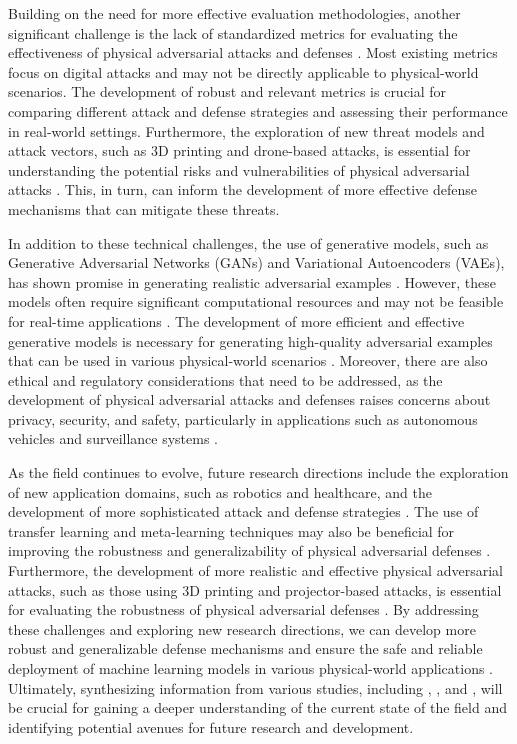 \documentclass[11pt,a4paper]{article}
\begin{document}
Building on the need for more effective evaluation methodologies, another significant challenge is the lack of standardized metrics for evaluating the effectiveness of physical adversarial attacks and defenses \cite{doi:10.1109/tgrs.2022.3225306}. Most existing metrics focus on digital attacks and may not be directly applicable to physical-world scenarios. The development of robust and relevant metrics is crucial for comparing different attack and defense strategies and assessing their performance in real-world settings. Furthermore, the exploration of new threat models and attack vectors, such as 3D printing and drone-based attacks, is essential for understanding the potential risks and vulnerabilities of physical adversarial attacks \cite{arxiv:1707.08945}. This, in turn, can inform the development of more effective defense mechanisms that can mitigate these threats.

In addition to these technical challenges, the use of generative models, such as Generative Adversarial Networks (GANs) and Variational Autoencoders (VAEs), has shown promise in generating realistic adversarial examples \cite{doi:10.1109/cvpr.2019.00935}. However, these models often require significant computational resources and may not be feasible for real-time applications \cite{arxiv:1907.05418}. The development of more efficient and effective generative models is necessary for generating high-quality adversarial examples that can be used in various physical-world scenarios \cite{doi:10.1016/j.jisa.2020.102694}. Moreover, there are also ethical and regulatory considerations that need to be addressed, as the development of physical adversarial attacks and defenses raises concerns about privacy, security, and safety, particularly in applications such as autonomous vehicles and surveillance systems \cite{arxiv:2007.16118}.

As the field continues to evolve, future research directions include the exploration of new application domains, such as robotics and healthcare, and the development of more sophisticated attack and defense strategies \cite{doi:10.1016/j.eng.2019.12.012}. The use of transfer learning and meta-learning techniques may also be beneficial for improving the robustness and generalizability of physical adversarial defenses \cite{arxiv:2210.07540}. Furthermore, the development of more realistic and effective physical adversarial attacks, such as those using 3D printing and projector-based attacks, is essential for evaluating the robustness of physical adversarial defenses \cite{doi:10.1109/cvpr52688.2022.01487}. By addressing these challenges and exploring new research directions, we can develop more robust and generalizable defense mechanisms and ensure the safe and reliable deployment of machine learning models in various physical-world applications \cite{doi:10.1109/tpami.2024.3430860}. Ultimately, synthesizing information from various studies, including \cite{doi:10.1201/9781351251389-8}, \cite{doi:10.1609/aaai.v34i01.5443}, and \cite{doi:10.1109/tpami.2022.3176760}, will be crucial for gaining a deeper understanding of the current state of the field and identifying potential avenues for future research and development.
\end{document}
